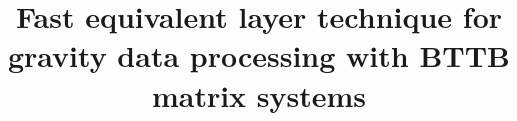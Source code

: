 \documentclass[manuscript,revised]{geophysics}
\begin{document}
\title{Fast equivalent layer technique for gravity data processing with BTTB matrix systems}

\renewcommand{\thefootnote}{\fnsymbol{footnote}} 




\maketitle

\begin{abstract}

\lipsum[1]


\end{abstract}
\end{document}
